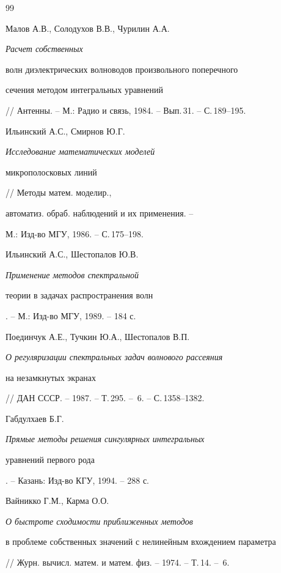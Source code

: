\begin{thebibliography}{99}




Малов А.В., Солодухов В.В., Чурилин А.А. {\em Расчет собственных


волн диэлектрических волноводов произвольного поперечного


сечения методом интегральных уравнений}


// Антенны. -- М.: Радио и связь, 1984. -- Вып.\,31. -- С.\,189--195.






Ильинский А.С., Смирнов Ю.Г. {\em Исследование математических моделей 


микрополосковых линий} // Методы матем. моделир., 


автоматиз. обраб. наблюдений и их применения. --


М.: Изд-во МГУ, 1986. -- С.\,175--198.






Ильинский А.С., Шестопалов Ю.В. {\em Применение методов спектральной


теории в задачах распространения волн}. -- М.: Изд-во МГУ, 1989. -- 184 с.






Поединчук А.Е., Тучкин Ю.А., Шестопалов В.П.


{\em О регуляризации спектральных задач волнового рассеяния


на незамкнутых экранах}


// ДАН СССР. -- 1987. -- Т.\,295. -- \No\,6. -- С.\,1358--1382.






Габдулхаев Б.Г. {\em Прямые методы решения сингулярных интегральных 


уравнений первого рода}. -- Казань: Изд-во КГУ, 1994. -- 288 с.






Вайникко Г.М., Карма О.О. {\em О быстроте сходимости приближенных методов


в проблеме собственных значений с нелинейным вхождением параметра}


// Журн. вычисл. матем. и матем. физ. -- 1974. -- Т.\,14. -- \No\,6.



\end{thebibliography}
